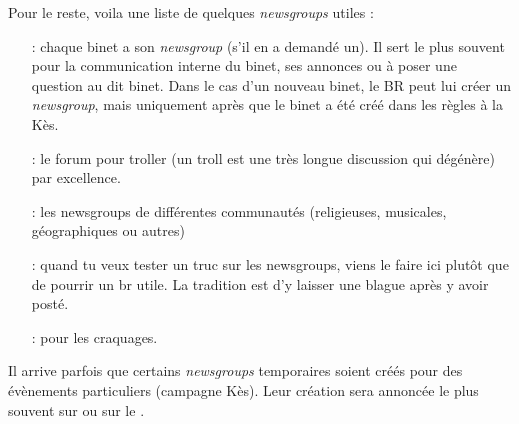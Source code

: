 \bigskip

Pour le reste, voila une liste de quelques \emph{newsgroups} utiles :
\begin{itemize}
\item[\ngname{br.binet.ton\_binet} :] chaque binet a son \emph{newsgroup} (s'il en a demandé un). Il sert le plus souvent pour la communication interne du binet, ses annonces ou à poser une question au dit binet. Dans le cas d'un nouveau binet, le BR peut lui créer un \emph{newsgroup}, mais uniquement après que le binet a été créé dans les règles à la Kès.

\item[\ngname{br.binet.polemix} :] le forum pour troller (un troll est une très longue discussion qui dégénère) par excellence.
                          
\item[\ngname{br.communauté.*} :] les newsgroups de différentes communautés (religieuses, musicales, géographiques ou autres)

\item[\ngname{br.test} :] quand tu veux tester un truc sur les newsgroups, viens le faire ici plutôt que de pourrir un br utile. La tradition est d'y laisser une blague après y avoir posté.

 \item[\ngname{br.trash} :] pour les craquages.

\end{itemize}

\bigskip 
Il arrive parfois que certains \emph{newsgroups} temporaires soient créés pour des évènements particuliers (campagne Kès). Leur création sera annoncée
le plus souvent sur \fkz ou sur le .

